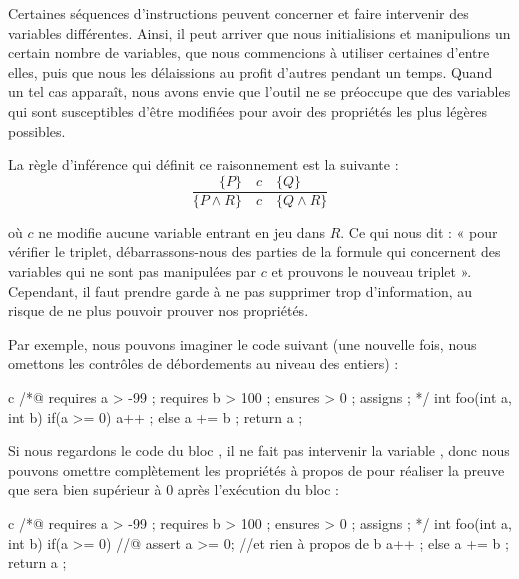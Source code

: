 \label{l3:statements-basic-constancy}


Certaines séquences d'instructions peuvent concerner et faire intervenir des 
variables différentes. Ainsi, il peut arriver que nous initialisions et manipulions
un certain nombre de variables, que nous commencions à utiliser certaines d'entre 
elles, puis que nous les délaissions au profit d'autres pendant un temps. Quand un
tel cas apparaît, nous avons envie que l'outil ne se préoccupe que des variables 
qui sont susceptibles d'être modifiées pour avoir des propriétés les plus légères 
possibles.



La règle d'inférence qui définit ce raisonnement est la suivante :
$$\dfrac{\{P\}\quad c\quad \{Q\}}{\{P \wedge R\}\quad c\quad \{Q \wedge R\}}$$



où $c$ ne modifie aucune variable entrant en jeu dans $R$. Ce qui nous dit : « pour 
vérifier le triplet, débarrassons-nous des parties de la formule qui concernent des
variables qui ne sont pas manipulées par $c$ et prouvons le nouveau triplet ». 
Cependant, il faut prendre garde à ne pas supprimer trop d'information, au risque
de ne plus pouvoir prouver nos propriétés.



Par exemple, nous pouvons imaginer le code suivant (une nouvelle fois, nous omettons
les contrôles de débordements au niveau des entiers) :



\begin{CodeBlock}{c}
/*@
  requires a > -99 ;
  requires b > 100 ;
  ensures  \result > 0 ;
  assigns  \nothing ;
*/
int foo(int a, int b){
  if(a >= 0){
    a++ ;
  } else {
    a += b ;
  }
  return a ;
}
\end{CodeBlock}



Si nous regardons le code du bloc , il ne fait pas intervenir la variable
, donc nous pouvons omettre complètement les propriétés à propos de   pour
réaliser la preuve que  sera bien supérieur à 0 après l'exécution du bloc :



\begin{CodeBlock}{c}
/*@
  requires a > -99 ;
  requires b > 100 ;
  ensures  \result > 0 ;
  assigns  \nothing ;
*/
int foo(int a, int b){
  if(a >= 0){
    //@ assert a >= 0; //et rien à propos de b
    a++ ;
  } else {
    a += b ;
  }
  return a ;
}
\end{CodeBlock}



